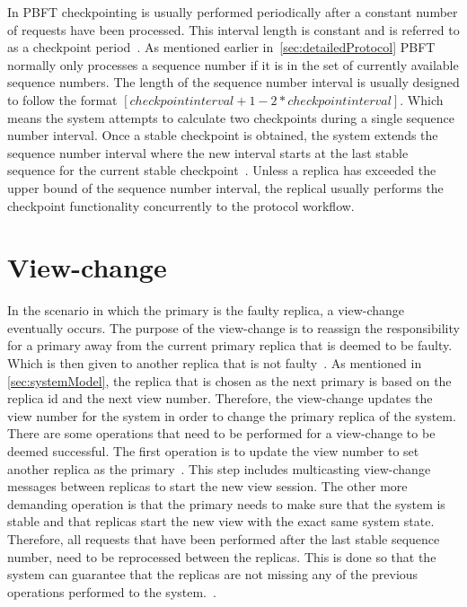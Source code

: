 In PBFT checkpointing is usually performed periodically after a constant number of requests have been processed. This interval length is constant and is referred to as a checkpoint period~\cites[p.~261]{BOOK:BuildDepDistSyst}[p.~410]{PAPER:PBFTRecovery}. As mentioned earlier in~\autoref{sec:detailedProtocol} PBFT normally only processes a sequence number if it is in the set of currently available sequence numbers. The length of the sequence number interval is usually designed to follow the format $[checkpointinterval+1-2*checkpointinterval]$. Which means the system attempts to calculate two checkpoints during a single sequence number interval. Once a stable checkpoint is obtained, the system extends the sequence number interval where the new interval starts at the last stable sequence for the current stable checkpoint~\cites[p.~5]{PAPER:OGPBFT}[p.~410]{PAPER:PBFTRecovery}. Unless a replica has exceeded the upper bound of the sequence number interval, the replical usually performs the checkpoint functionality concurrently to the protocol workflow.

\section{View-change}
\label{sec:view-change}
In the scenario in which the primary is the faulty replica, a view-change eventually occurs. The purpose of the view-change is to reassign the responsibility for a primary away from the current primary replica that is deemed to be faulty. Which is then given to another replica that is not faulty~\cites[p.262]{BOOK:BuildDepDistSyst}. As mentioned in \autoref{sec:systemModel}, the replica that is chosen as the next primary is based on the replica id and the next view number. Therefore, the view-change updates the view number for the system in order to change the primary replica of the system. There are some operations that need to be performed for a view-change to be deemed successful. The first operation is to update the view number to set another replica as the primary~\cites[p.~6]{PAPER:OGPBFT}[p.~411]{PAPER:PBFTRecovery}{WEB:SawtoothPBFT}. This step includes multicasting view-change messages between replicas to start the new view session. The other more demanding operation is that the primary needs to make sure that the system is stable and that replicas start the new view with the exact same system state. Therefore, all requests that have been performed after the last stable sequence number, need to be reprocessed between the replicas. This is done so that the system can guarantee that the replicas are not missing any of the previous operations performed to the system.~\cites[p.~458]{BOOK:MVstandver3}[p.~263-265]{BOOK:BuildDepDistSyst}.

